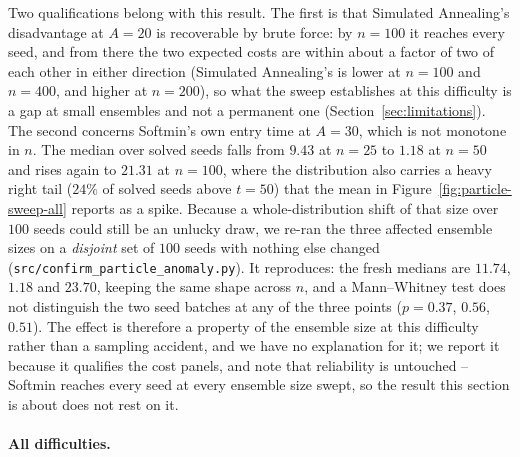 \documentclass{article}
\theoremstyle{plain}
\theoremstyle{definition}
\theoremstyle{remark}
\begin{document}
Two qualifications belong with this result. The first is that Simulated Annealing's disadvantage at
$A=20$ is recoverable by brute force: by $n=100$ it reaches every seed, and from there the two expected
costs are within about a factor of two of each other in either direction (Simulated Annealing's is
lower at $n=100$ and $n=400$, and higher at $n=200$), so what the sweep establishes at this
difficulty is a gap at small ensembles and not a permanent one
(Section~\ref{sec:limitations}). The second concerns Softmin's own entry time at $A=30$, which is
not monotone in $n$. The median over solved seeds falls from $9.43$ at $n=25$ to $1.18$ at $n=50$
and rises again to $21.31$ at $n=100$, where the distribution also carries a heavy right tail
($24\%$ of solved seeds above $t=50$) that the mean in Figure~\ref{fig:particle-sweep-all} reports
as a spike. Because a whole-distribution shift of that size over $100$ seeds could still be an
unlucky draw, we re-ran the three affected ensemble sizes on a \emph{disjoint} set of $100$ seeds
with nothing else changed (\texttt{src/confirm\_particle\_anomaly.py}). It reproduces: the fresh
medians are $11.74$, $1.18$ and $23.70$, keeping the same shape across $n$, and a Mann--Whitney
test does not distinguish the two seed batches at any of the three points ($p=0.37$, $0.56$,
$0.51$). The effect is therefore a property of the ensemble size at this difficulty rather than a
sampling accident, and we have no explanation for it; we report it because it qualifies the cost
panels, and note that reliability is untouched -- Softmin reaches every seed at every ensemble size
swept, so the result this section is about does not rest on it.

\paragraph{All difficulties.}\label{apx:particle-sweep-all}
\end{document}
